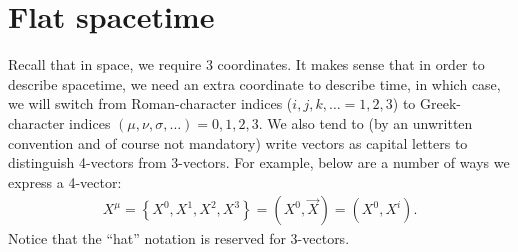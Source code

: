 \documentclass{article}
\theoremstyle{definition}
\begin{document}
\newpage

\section{Flat spacetime}
Recall that in space, we require 3 coordinates. It makes sense that in order to describe spacetime, we need an extra coordinate to describe time, in which case, we will switch from Roman-character indices ($i,j,k,\dots = 1,2,3$) to Greek-character indices $(\mu, \nu, \sigma, \dots) = 0,1,2,3$. We also tend to (by an unwritten convention and of course not mandatory) write vectors as capital letters to distinguish 4-vectors from 3-vectors. For example, below are a number of ways we express a 4-vector:
\begin{align*}
X^\mu = \left\{ X^0, X^1, X^2, X^3\right\} = \left( X^0, \vec{X} \right)  = \left( X^0, X^i\right) .
\end{align*}   
Notice that the ``hat'' notation is reserved for 3-vectors. 
\end{document}
